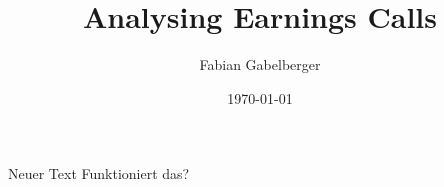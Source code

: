\documentclass[a4paper, 10pt, xcolor=dvipsnames]{article} %
\date{\vspace{-9ex}} %
\title{Analysing Earnings Calls
}
\author{Fabian Gabelberger}
\date{\today}
\begin{document}
\maketitle
\vspace{2em}

Neuer Text
Funktioniert das?
\end{document}

